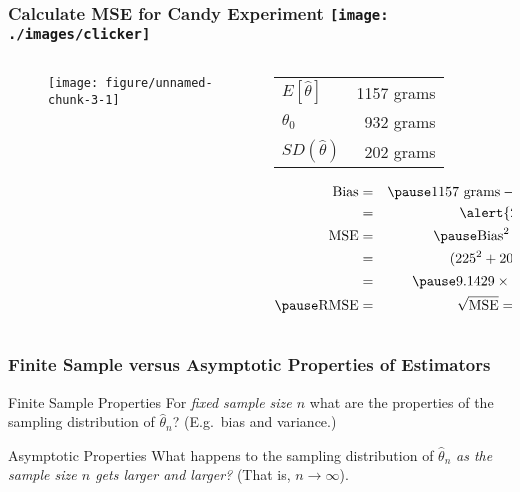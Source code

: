 \documentclass[handout]{beamer}
\makeatletter
\def\maxwidth{ %
  \ifdim\Gin@nat@width>\linewidth
    \linewidth
  \else
    \Gin@nat@width
  \fi
}
\newenvironment{knitrout}{}{} %
\makeatother
\begin{document}
\begin{frame}
\frametitle{Calculate MSE for Candy Experiment \hfill \texttt{[image: ./images/clicker]}}


\begin{columns} 

\begin{column}[c]{4cm} 
\begin{figure}
\begin{knitrout}
\color{fgcolor}

{\centering \texttt{[image: figure/unnamed-chunk-3-1]} 

}



\end{knitrout}
\end{figure}

\end{column} 

\begin{column}[c]{6cm} 
\small
   \begin{tabular}{lr}
   \hline
   \hline
   $E[\hat{\theta}]$& 1157 grams\\
   $\theta_0$& 932 grams\\
   $SD(\widehat{\theta})$& 202 grams\\
   \hline
   \end{tabular}
\vspace{2em}

\begin{eqnarray*}
	\mbox{Bias} &=& \pause 1157 \mbox{ grams} - 932 \mbox{ grams}\\
		&=& \alert{225 \mbox{ grams}}\\
		\mbox{MSE} &=&\pause  \mbox{Bias}^2 + \mbox{Variance}\\
			&=& (225^2 + 202^2)\mbox{ grams}^2\\
				&=&\pause \ensuremath{9.1429\times 10^{4}} \mbox{ grams}^2\\ \pause
				\mbox{RMSE} &=& \sqrt{\mbox{MSE}} =  302 \mbox{ grams}
\end{eqnarray*}
\end{column} 

\end{columns} 


\end{frame}
\begin{frame}
\frametitle{Finite Sample versus Asymptotic Properties of Estimators}

\begin{block}{Finite Sample Properties}
For \alert{\emph{fixed sample size $n$}} what are the properties of the sampling distribution of $\widehat{\theta}_n$? (E.g.\ bias and variance.)
\end{block}
\begin{block}{Asymptotic Properties}
What happens to the sampling distribution of $\widehat{\theta}_n$ \alert{\emph{as the sample size $n$ gets larger and larger?}} (That is, $n\rightarrow \infty$).
\end{block}

\end{frame}
\end{document}
